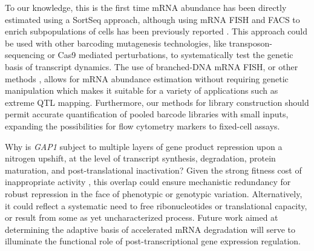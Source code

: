 To our knowledge, this is the first time mRNA abundance has
been directly estimated using a SortSeq approach, although 
using mRNA FISH and FACS to enrich subpopulations of cells has been
previously reported
\parencite{klemm2014transcriptional,hanley2013detection,sliva2016barcode}. This
approach could be used with other barcoding mutagenesis technologies,
like transposon-sequencing or Cas9 mediated perturbations, to
systematically test the genetic basis of transcript dynamics.
The use of branched-DNA mRNA FISH, or other methods
\parencite{rouhanifard2017single}, allows for mRNA abundance estimation without
requiring genetic manipulation which makes it suitable for a variety
of applications such as extreme QTL mapping. 
Furthermore, our methods for library construction should permit accurate
quantification of pooled barcode libraries with small inputs, 
expanding the possibilities for flow cytometry markers to fixed-cell assays.

Why is \textit{GAP1} subject to multiple layers of gene product repression upon
a nitrogen upshift, at the level of transcript synthesis, degradation,
protein maturation, and post-translational inactivation? Given the
strong fitness cost of inappropriate activity
\parencite{risinger2006activity},
this overlap could ensure mechanistic redundancy for robust repression in
the face of phenotypic or genotypic variation. Alternatively, it could
reflect a systematic need to free ribonucleotides or
translational capacity, or result from some as yet uncharacterized
process.
Future work aimed at determining the adaptive basis of accelerated
mRNA degradation will serve to illuminate the functional role of
post-transcriptional gene expression regulation.

